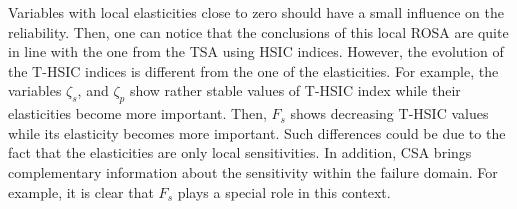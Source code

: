 Variables with local elasticities close to zero should have a small influence on the reliability. 
Then, one can notice that the conclusions of this local ROSA are quite in line with the one from the TSA using HSIC indices. 
However, the evolution of the T-HSIC indices is different from the one of the elasticities. 
For example, the variables $\zeta_s$, and $\zeta_p$ show rather stable values of T-HSIC index while their elasticities become more important. 
Then, $F_s$ shows decreasing T-HSIC values while its elasticity becomes more important. 
Such differences could be due to the fact that the elasticities are only local sensitivities. 
In addition, CSA brings complementary information about the sensitivity within the failure domain. 
For example, it is clear that $F_s$ plays a special role in this context.


